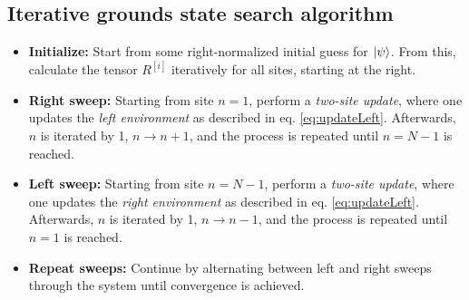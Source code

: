 \subsection{Iterative grounds state search algorithm}
\begin{itemize}
\item[]
\textbf{Initialize:} Start from some right-normalized initial guess for $\ket{\psi}$. From this, calculate the tensor $R^{[i]}$ iteratively for all sites, starting at the right.

\item[]
\textbf{Right sweep:} Starting from site $n = 1$, perform a \textit{two-site update}, where one updates the \textit{left environment} as described in eq. \eqref{eq:updateLeft}. Afterwards, $n$ is iterated by 1, $n \rightarrow n + 1$, and the process is repeated until $n = N-1$ is reached.

\item[]
\textbf{Left sweep:} Starting from site $n = N-1$, perform a \textit{two-site update}, where one updates the \textit{right environment} as described in eq. \eqref{eq:updateLeft}. Afterwards, $n$ is iterated by 1, $n \rightarrow n - 1$, and the process is repeated until $n = 1$ is reached.

\item[]
\textbf{Repeat sweeps:} Continue by alternating between left and right sweeps through the system until convergence is achieved.  
\end{itemize}